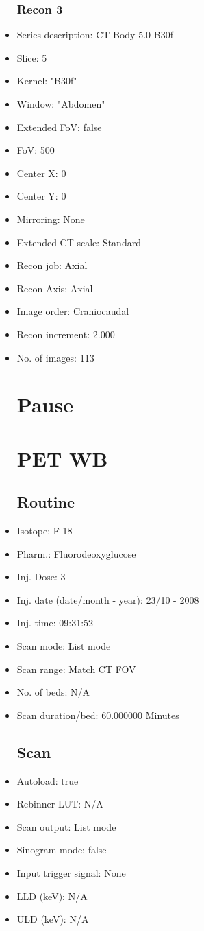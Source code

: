 \documentclass[12pt]{article}
\begin{document}
\begin{itemize}
\subsubsection{Recon 3}
\item Series description: CT Body 5.0 B30f
\item Slice: 5
\item Kernel: "B30f"
\item Window: "Abdomen"
\item Extended FoV: false
\item FoV: 500
\item Center X: 0
\item Center Y: 0
\item Mirroring: None
\item Extended CT scale: Standard
\item Recon job: Axial
\item Recon Axis: Axial
\item Image order: Craniocaudal
\item Recon increment: 2.000
\item No. of images: 113
\section{Pause}

\section{PET WB}
\subsection{Routine}
\item Isotope: F-18
\item Pharm.: Fluorodeoxyglucose
\item Inj. Dose: 3 
\item Inj. date (date/month - year): 23/10 - 2008
\item Inj. time: 09:31:52
\item Scan mode: List mode
\item Scan range: Match CT FOV
\item No. of beds: N/A
\item Scan duration/bed: 60.000000 Minutes
\subsection{Scan}
\item Autoload: true
\item Rebinner LUT: N/A
\item Scan output: List mode
\item Sinogram mode: false
\item Input trigger signal: None
\item LLD (keV): N/A
\item ULD (keV): N/A

\end{itemize}
\end{document}
